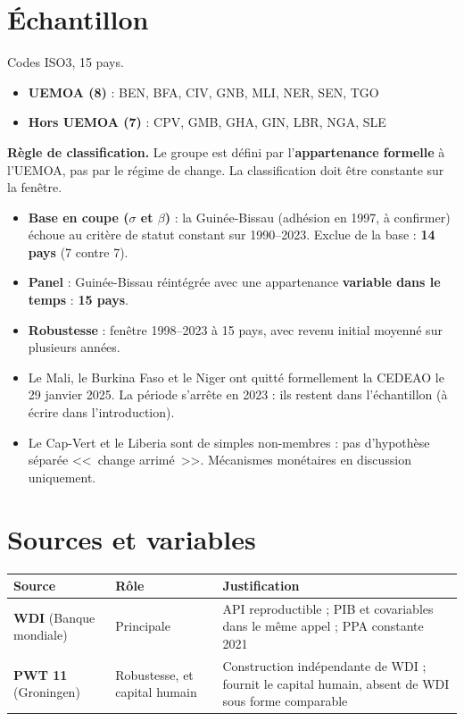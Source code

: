 \documentclass[21pt,a4paper]{article}
\newcommand{\sig}{\texorpdfstring{$\sigma$}{sigma}}
\newcommand{\bet}{\texorpdfstring{$\beta$}{beta}}
\begin{document}
	\section{Échantillon}
	
	Codes ISO3, 15 pays.
	
	\begin{itemize}
		\item \textbf{UEMOA (8)} : BEN, BFA, CIV, GNB, MLI, NER, SEN, TGO
		\item \textbf{Hors UEMOA (7)} : CPV, GMB, GHA, GIN, LBR, NGA, SLE
	\end{itemize}
	
	\textbf{Règle de classification.} Le groupe est défini par l'\textbf{appartenance formelle} à l'UEMOA, pas par le régime de change. La classification doit être constante sur la fenêtre.
	
	\begin{itemize}
		\item \textbf{Base en coupe (\sig{} et \bet)} : la Guinée-Bissau (adhésion en 1997, à confirmer) échoue au critère de statut constant sur 1990--2023. Exclue de la base : \textbf{14 pays} (7 contre 7).
		\item \textbf{Panel} : Guinée-Bissau réintégrée avec une appartenance \textbf{variable dans le temps} : \textbf{15 pays}.
		\item \textbf{Robustesse} : fenêtre 1998--2023 à 15 pays, avec revenu initial moyenné sur plusieurs années.
		\item Le Mali, le Burkina Faso et le Niger ont quitté formellement la CEDEAO le 29 janvier 2025. La période s'arrête en 2023 : ils restent dans l'échantillon (à écrire dans l'introduction).
		\item Le Cap-Vert et le Liberia sont de simples non-membres : pas d'hypothèse séparée <<~change arrimé~>>. Mécanismes monétaires en discussion uniquement.
	\end{itemize}
	
	\section{Sources et variables}
	
	\begin{center}
		\small
		\begin{tabularx}{\textwidth}{@{}L{3.4cm}L{3.4cm}Y@{}}
			\toprule
			\textbf{Source} & \textbf{Rôle} & \textbf{Justification} \\
			\midrule
			\textbf{WDI} (Banque mondiale) & Principale & API reproductible ; PIB et covariables dans le même appel ; PPA constante 2021 \\
			\addlinespace
			\textbf{PWT 11} (Groningen) & Robustesse, et capital humain & Construction indépendante de WDI ; fournit le capital humain, absent de WDI sous forme comparable \\
			\bottomrule
		\end{tabularx}
	\end{center}
	
\end{document}
